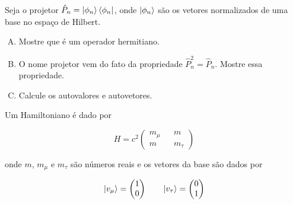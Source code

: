 \documentclass[a4paper, 12pt, notitlepage]{article}
\begin{document}
\begin{enumerate}
Seja o projetor $\hat{P}_n = \ket{\phi_n}\bra{\phi_n}$, onde $\ket{\phi_n}$ são os vetores normalizados de uma base no espaço de Hilbert.
  \begin{enumerate}[(A)]
    \item Mostre que é um operador hermitiano.
    \item O nome projetor vem do fato da propriedade $\hat{P}_n^2 = \hat{P}_n$. Mostre essa propriedade.
    \item Calcule os autovalores e autovetores.
  \end{enumerate}

Um Hamiltoniano é dado por

\begin{equation}\label{eq:H.neutrinos}
  H = c^2
    \begin{pmatrix}
    m_\mu && m \\
    m && m_\tau
    \end{pmatrix}
\end{equation}

\noindent onde $m$, $m_\mu$ e $m_\tau$ são números reais e os vetores da base são dados por

\begin{equation*}
  \ket{v_\mu} = \begin{pmatrix} 1 \\ 0\end{pmatrix} \qquad
  \ket{v_\tau} = \begin{pmatrix} 0 \\ 1\end{pmatrix}
\end{equation*}


\end{enumerate}
\end{document}
